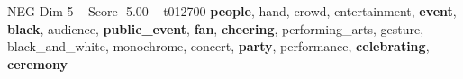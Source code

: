 \begin{textsample}{NEG Dim 5 – Score -5.00 – t012700}  \label{ex:f5_neg_033}
\textbf{people}, hand, crowd, entertainment, \textbf{event}, \textbf{black}, audience, \textbf{public\_event}, \textbf{fan}, \textbf{cheering}, performing\_arts, gesture, black\_and\_white, monochrome, concert, \textbf{party}, performance, \textbf{celebrating}, \textbf{ceremony}

\end{textsample}
